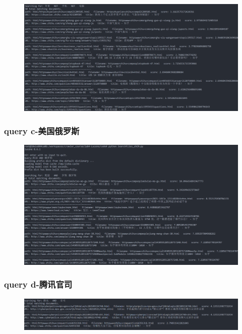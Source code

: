 \documentclass[12pt,a4paper]{article}
\begin{document}
\begin{figure}[H]
	\includegraphics[width=\textwidth]{query4.png}
	\centering
\end{figure}

\subsubsection{query c-美国俄罗斯}
\begin{figure}[H]
	\includegraphics[width=\textwidth]{query5.png}
	\centering
\end{figure}

\subsubsection{query d-腾讯官司}
\begin{figure}[H]
	\includegraphics[width=\textwidth]{query6.png}
	\centering
\end{figure}
\end{document}
